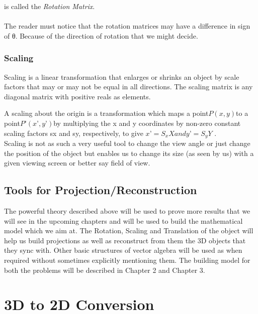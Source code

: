 \documentclass[12pt]{report}
\begin{document}
is called the \textit{Rotation Matrix}.\\


\\
The reader must notice that the rotation matrices may have a difference in sign of θ. Because of the direction of rotation that we might decide.\\

\subsection{Scaling}

Scaling is a linear transformation that enlarges or shrinks an object by scale factors that may or may not be equal in all directions. The scaling matrix is any diagonal matrix with positive reals as elements.\\
\vspace{0.3cm}

A scaling about the origin is a transformation which maps a point$ P(x, y) $to a point$ P’ (x’ , y’ ) $by multiplying the x and y coordinates by non-zero constant scaling factors sx and sy, respectively, to give $ x’ = S_{x} X and y’ = S_{y} Y$ .
\vspace{0.3cm}
\\
Scaling is not as such a very useful tool to change the view angle or just change the position of the object but enables us to change its size (as seen by us) with a given viewing screen or better say field of view.

\section{Tools for Projection/Reconstruction}

The powerful theory described above will be used to prove more results that we will see in the upcoming chapters and will be used to build the mathematical model which we aim at. The Rotation, Scaling and Translation of the object will help us build projections as well as reconstruct from them the 3D objects that they sync with. Other basic structures of vector algebra will be used as when required without sometimes explicitly mentioning them. The building model for both the problems will be described in Chapter 2 and Chapter 3.\\


\chapter{3D to 2D Conversion}
\end{document}
